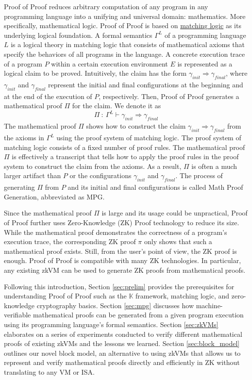 \documentclass{article}
\theoremstyle{plain}
\theoremstyle{definition}
\newcommand{\To}{\Rightarrow}
\newcommand{\K}{$\mathbb{K}$\xspace}
\newcommand{\init}{{\textit{init}}}
\newcommand{\final}{{\textit{final}}}
\begin{document}
Proof of Proof reduces arbitrary computation of any program in any programming language 
into a unifying and universal domain: mathematics. 
More specifically, mathematical logic. 
Proof of Proof is based on \href{https://matching-logic.org}{matching logic}
as its underlying logical foundation. 
A formal semantics $\Gamma^L$ of a programming language $L$ is a logical theory in matching logic
that consists of mathematical axioms that specify the behaviors of all programs in the language. 
A concrete execution trace of a program $P$ within a certain execution environment $E$
is represented as a logical claim to be proved. 
Intuitively, the claim has the form
$\gamma_\init \To \gamma_\final$,
where $\gamma_\init$ and $\gamma_\final$ represent the 
initial and final configurations at the beginning and at the end of the execution of $P$, respectively. 
Then, Proof of Proof generates a mathematical proof $\Pi$ for the claim.
We denote it as
\begin{equation}
\label{eq:claim}
  \Pi \ \colon\  \Gamma^L \vdash \gamma_\init \To \gamma_\final
\end{equation}
The mathematical proof $\Pi$ shows how to construct the claim $\gamma_\init \To \gamma_\final$
from the axioms in $\Gamma^L$ using the proof system of matching logic. 
The proof system of matching logic consists of a fixed number of proof rules. 
The mathematical proof $\Pi$ is effectively
a transcript that tells how to apply the proof rules in the proof system
to construct the claim from the axioms. 
As a result, $\Pi$ is often a much larger artifact than $P$ or the configurations
$\gamma_\init$ and $\gamma_\final$. 
The process of generating $\Pi$ from $P$ and its initial and final configurations
is called Math Proof Generation, abbreviated as MPG. 

Since the mathematical proof $\Pi$ is large and its usage could be unpractical, Proof of Proof further uses Zero-Knowledge (ZK) Proof technology to reduce its size. While the mathematical proof demonstrates the correctness of a program's execution trace, the corresponding ZK proof $\pi$ only shows that such a mathematical proof exists. Still, from the user's point of view, the ZK proof is enough. Proof of Proof is compatible with many ZK technologies. In particular, any existing zkVM can be used to generate ZK proofs from mathematical proofs.

Following this introduction, Section \ref{sec:prelim} provides the prerequisites for understanding Proof of Proof such as the \K framework, matching logic, and zero-knowledge cryptography basics. Section \ref{sec:mpg} discusses how machine-verifiable mathematical proofs can be generated from a given program execution using its programming language's formal semantics. Section \ref{sec:zkVMs} elaborates on a series of experiments conducted to verify different mathematical proofs of existing zkVMs and the lessons we learned. Section \ref{sec:block_model} outlines our novel block model, an alternative to using zkVMs that allows us to represent and verify mathematical proofs directly and efficiently in ZK without translating to any VM or ISA.  
\end{document}
